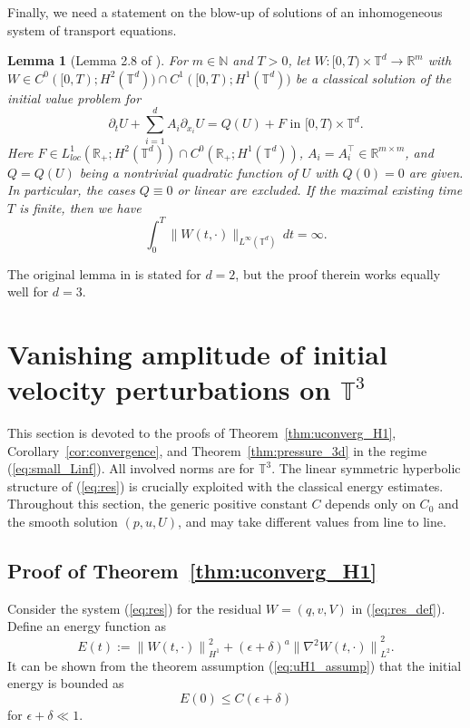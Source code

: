 \documentclass[reqno,10pt]{amsart}
\newtheorem{lemma}[theorem]{Lemma}
\theoremstyle{definition}
\theoremstyle{remark}
\numberwithin{equation}{section}
\begin{document}
Finally, we need a statement on the blow-up of solutions of an  inhomogeneous system of transport equations. 

\begin{lemma} [Lemma 2.8 of \cite{HRYZ25}] \label{lem:blowup}
For $m \in \mathbb N$ and $T>0$, let $W: [0,T)\times {\mathbb T^d}  \to \mathbb R^m$ with $W\in C^0([0,T);H^2(\mathbb T^d))\cap C^1([0,T);H^1(\mathbb T^d))$ be a classical solution of the initial value problem for 
\[ \partial_t U + \sum^d_{i=1} A_i \partial_{x_i}U = Q(U) + F \text{ in $[0,T)\times \mathbb T^d$.}  \]
Here $F\in L^1_{loc}(\mathbb R_+;H^2(\mathbb T^d))\cap C^0(\mathbb R_+;H^1(\mathbb T^d))$, $A_i=A^\top_i\in \mathbb R^{m\times m}$, and $Q=Q(U)$ being a nontrivial quadratic function of $U$ with $Q(0)=0$ are given. In particular, the cases $Q\equiv 0$ or linear are excluded.
If the maximal existing time $T$ is finite, then we have
    \[ \int^T_0 \|W(t,\cdot)\|_{L^\infty(\mathbb T^d)}\, dt=\infty. \]
\end{lemma}
The original lemma in \cite{HRYZ25} is stated for $d=2$, but the proof therein works equally well for $d=3$.

\section{Vanishing amplitude of initial velocity perturbations on $\mathbb T^3$} \label{sec:small} 
This section is devoted to the proofs of Theorem~\ref{thm:uconverg_H1}, Corollary~\ref{cor:convergence}, and Theorem~\ref{thm:pressure_3d} in the regime (\ref{eq:small_Linf}). All involved norms are for $\mathbb T^3$. The linear symmetric hyperbolic structure of (\ref{eq:res}) is crucially exploited with the classical energy estimates. Throughout this section, the generic positive constant $C$ depends only on $C_0$ and the smooth solution $(p,u,U)$, and may take different values from line to line.

\subsection{Proof of Theorem~\ref{thm:uconverg_H1}} \label{subsec:thm:uconverg_H1}

Consider the system (\ref{eq:res}) for the residual $W=(q,v,V)$ in (\ref{eq:res_def}). Define an energy function as
\[
    E(t) := {\| W(t,\cdot)\|}_{H^1}^2 + (\epsilon+\delta)^a {\| \nabla^2 W(t,\cdot)\|}_{L^2}^2.
\]
It can be shown from the theorem assumption (\ref{eq:uH1_assump}) that the initial energy is bounded as
\[ E(0) \le C(\epsilon+\delta) \]
for $\epsilon+\delta\ll 1$. 
\end{document}
